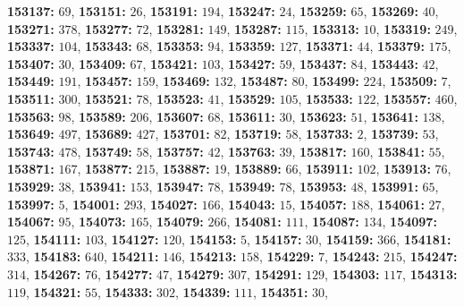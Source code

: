 \textsf{\bfseries 153137:} $69$, \textsf{\bfseries 153151:} $26$, \textsf{\bfseries 153191:} $194$, \textsf{\bfseries 153247:} $24$, \textsf{\bfseries 153259:} $65$, \textsf{\bfseries 153269:} $40$, \textsf{\bfseries 153271:} $378$, \textsf{\bfseries 153277:} $72$, \textsf{\bfseries 153281:} $149$, \textsf{\bfseries 153287:} $115$, \textsf{\bfseries 153313:} $10$, \textsf{\bfseries 153319:} $249$, \textsf{\bfseries 153337:} $104$, \textsf{\bfseries 153343:} $68$, \textsf{\bfseries 153353:} $94$, \textsf{\bfseries 153359:} $127$, \textsf{\bfseries 153371:} $44$, \textsf{\bfseries 153379:} $175$, \textsf{\bfseries 153407:} $30$, \textsf{\bfseries 153409:} $67$, \textsf{\bfseries 153421:} $103$, \textsf{\bfseries 153427:} $59$, \textsf{\bfseries 153437:} $84$, \textsf{\bfseries 153443:} $42$, \textsf{\bfseries 153449:} $191$, \textsf{\bfseries 153457:} $159$, \textsf{\bfseries 153469:} $132$, \textsf{\bfseries 153487:} $80$, \textsf{\bfseries 153499:} $224$, \textsf{\bfseries 153509:} $7$, \textsf{\bfseries 153511:} $300$, \textsf{\bfseries 153521:} $78$, \textsf{\bfseries 153523:} $41$, \textsf{\bfseries 153529:} $105$, \textsf{\bfseries 153533:} $122$, \textsf{\bfseries 153557:} $460$, \textsf{\bfseries 153563:} $98$, \textsf{\bfseries 153589:} $206$, \textsf{\bfseries 153607:} $68$, \textsf{\bfseries 153611:} $30$, \textsf{\bfseries 153623:} $51$, \textsf{\bfseries 153641:} $138$, \textsf{\bfseries 153649:} $497$, \textsf{\bfseries 153689:} $427$, \textsf{\bfseries 153701:} $82$, \textsf{\bfseries 153719:} $58$, \textsf{\bfseries 153733:} $2$, \textsf{\bfseries 153739:} $53$, \textsf{\bfseries 153743:} $478$, \textsf{\bfseries 153749:} $58$, \textsf{\bfseries 153757:} $42$, \textsf{\bfseries 153763:} $39$, \textsf{\bfseries 153817:} $160$, \textsf{\bfseries 153841:} $55$, \textsf{\bfseries 153871:} $167$, \textsf{\bfseries 153877:} $215$, \textsf{\bfseries 153887:} $19$, \textsf{\bfseries 153889:} $66$, \textsf{\bfseries 153911:} $102$, \textsf{\bfseries 153913:} $76$, \textsf{\bfseries 153929:} $38$, \textsf{\bfseries 153941:} $153$, \textsf{\bfseries 153947:} $78$, \textsf{\bfseries 153949:} $78$, \textsf{\bfseries 153953:} $48$, \textsf{\bfseries 153991:} $65$, \textsf{\bfseries 153997:} $5$, \textsf{\bfseries 154001:} $293$, \textsf{\bfseries 154027:} $166$, \textsf{\bfseries 154043:} $15$, \textsf{\bfseries 154057:} $188$, \textsf{\bfseries 154061:} $27$, \textsf{\bfseries 154067:} $95$, \textsf{\bfseries 154073:} $165$, \textsf{\bfseries 154079:} $266$, \textsf{\bfseries 154081:} $111$, \textsf{\bfseries 154087:} $134$, \textsf{\bfseries 154097:} $125$, \textsf{\bfseries 154111:} $103$, \textsf{\bfseries 154127:} $120$, \textsf{\bfseries 154153:} $5$, \textsf{\bfseries 154157:} $30$, \textsf{\bfseries 154159:} $366$, \textsf{\bfseries 154181:} $333$, \textsf{\bfseries 154183:} $640$, \textsf{\bfseries 154211:} $146$, \textsf{\bfseries 154213:} $158$, \textsf{\bfseries 154229:} $7$, \textsf{\bfseries 154243:} $215$, \textsf{\bfseries 154247:} $314$, \textsf{\bfseries 154267:} $76$, \textsf{\bfseries 154277:} $47$, \textsf{\bfseries 154279:} $307$, \textsf{\bfseries 154291:} $129$, \textsf{\bfseries 154303:} $117$, \textsf{\bfseries 154313:} $119$, \textsf{\bfseries 154321:} $55$, \textsf{\bfseries 154333:} $302$, \textsf{\bfseries 154339:} $111$, \textsf{\bfseries 154351:} $30$, 
